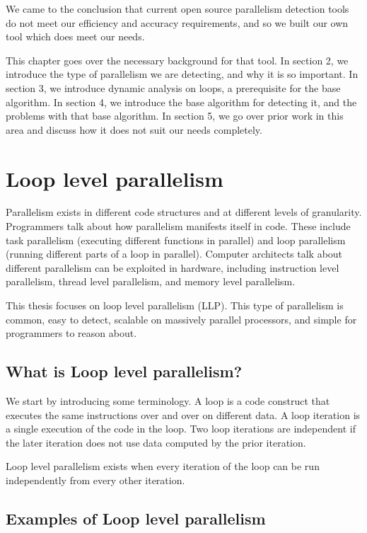 \documentclass[12pt,twoside]{reedthesis}
\begin{document}
		We came to the conclusion that current open source parallelism detection tools do not meet our efficiency and accuracy requirements, and so we built our own tool which does meet our needs. 
		
		This chapter goes over the necessary background for that tool. In section 2, we introduce the type of parallelism we are detecting, and why it is so important. In section 3, we introduce dynamic analysis on loops, a prerequisite for the base algorithm. In section 4, we introduce the base algorithm for detecting it, and the problems with that base algorithm. In section 5, we go over prior work in this area and discuss how it does not suit our needs completely. 
		
	\section{Loop level parallelism}
	
		Parallelism exists in different code structures and at different levels of granularity. Programmers talk about how parallelism manifests itself in code. These include task parallelism (executing different functions in parallel) and  loop parallelism (running different parts of a loop in parallel). Computer architects talk about different parallelism can be exploited in hardware, including instruction level parallelism, thread level parallelism, and memory level parallelism. 
		
		This thesis focuses on loop level parallelism (LLP). This type of parallelism is common, easy to detect, scalable on massively parallel processors, and simple for programmers to reason about. 
		
		\subsection{What is Loop level parallelism?}
		
		We start by introducing some terminology. A loop is a code construct that executes the same instructions over and over on different data. A loop iteration is a single execution of the code in the loop. Two loop iterations are independent if the later iteration does not use data computed by the prior iteration. 
		
		Loop level parallelism exists when every iteration of the loop can be run independently from every other iteration. 
		
		\subsection{Examples of Loop level parallelism}
		
\end{document}

